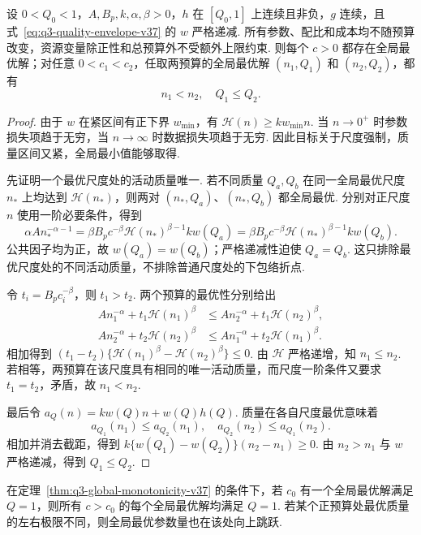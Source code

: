 \begin{theorem}[全局资源配置的预算单调性]\label{thm:q3-global-monotonicity-v37}
设 $0<Q_0<1$，$A,B_p,k,\alpha,\beta>0$，$h$ 在 $[Q_0,1]$ 上连续且非负，$g$ 连续，且式~\eqref{eq:q3-quality-envelope-v37} 的 $w$ 严格递减. 所有参数、配比和成本均不随预算改变，资源变量除正性和总预算外不受额外上限约束. 则每个 $c>0$ 都存在全局最优解；对任意 $0<c_1<c_2$，任取两预算的全局最优解 $(n_1,Q_1)$ 和 $(n_2,Q_2)$，都有
\begin{equation}\label{eq:q3-global-monotonicity-v37}
n_1<n_2,\quad Q_1\le Q_2.
\end{equation}
\end{theorem}
\begin{proof}
由于 $w$ 在紧区间有正下界 $w_{\min}$，有 $\mathscr H(n)\ge kw_{\min}n$. 当 $n\to0^+$ 时参数损失项趋于无穷，当 $n\to\infty$ 时数据损失项趋于无穷. 因此目标关于尺度强制，质量区间又紧，全局最小值能够取得. 

先证明一个最优尺度处的活动质量唯一. 若不同质量 $Q_a,Q_b$ 在同一全局最优尺度 $n_*$ 上均达到 $\mathscr H(n_*)$，则两对 $(n_*,Q_a)$、$(n_*,Q_b)$ 都全局最优. 分别对正尺度 $n$ 使用一阶必要条件，得到
\[
\alpha An_*^{-\alpha-1}
=\beta B_pc^{-\beta}\mathscr H(n_*)^{\beta-1}kw(Q_a)
=\beta B_pc^{-\beta}\mathscr H(n_*)^{\beta-1}kw(Q_b).
\]
公共因子均为正，故 $w(Q_a)=w(Q_b)$；严格递减性迫使 $Q_a=Q_b$. 这只排除最优尺度处的不同活动质量，不排除普通尺度处的下包络折点. 

令 $t_i=B_pc_i^{-\beta}$，则 $t_1>t_2$. 两个预算的最优性分别给出
\begin{align*}
An_1^{-\alpha}+t_1\mathscr H(n_1)^\beta
&\le An_2^{-\alpha}+t_1\mathscr H(n_2)^\beta,\\
An_2^{-\alpha}+t_2\mathscr H(n_2)^\beta
&\le An_1^{-\alpha}+t_2\mathscr H(n_1)^\beta.
\end{align*}
相加得到 $(t_1-t_2)\{\mathscr H(n_1)^\beta-\mathscr H(n_2)^\beta\}\le0$. 由 $\mathscr H$ 严格递增，知 $n_1\le n_2$. 若相等，两预算在该尺度具有相同的唯一活动质量，而尺度一阶条件又要求 $t_1=t_2$，矛盾，故 $n_1<n_2$. 

最后令 $a_Q(n)=kw(Q)n+w(Q)h(Q)$. 质量在各自尺度最优意味着
\[
a_{Q_1}(n_1)\le a_{Q_2}(n_1),\quad
a_{Q_2}(n_2)\le a_{Q_1}(n_2).
\]
相加并消去截距，得到 $k\{w(Q_1)-w(Q_2)\}(n_2-n_1)\ge0$. 由 $n_2>n_1$ 与 $w$ 严格递减，得到 $Q_1\le Q_2$. 
\end{proof}

\begin{corollary}[饱和持续性与质量跳跃的规模响应]\label{cor:q3-persistent-saturation-v37}
在定理~\ref{thm:q3-global-monotonicity-v37} 的条件下，若 $c_0$ 有一个全局最优解满足 $Q=1$，则所有 $c>c_0$ 的每个全局最优解均满足 $Q=1$. 若某个正预算处最优质量的左右极限不同，则全局最优参数量也在该处向上跳跃. 
\end{corollary}

